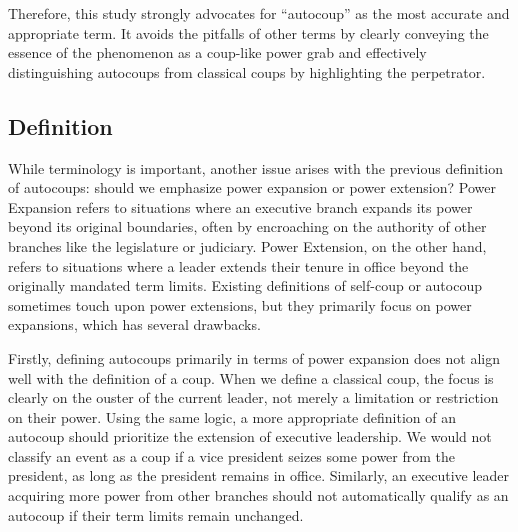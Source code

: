 \documentclass[
  12pt,
]{report}
\begin{document}
Therefore, this study strongly advocates for ``autocoup'' as the most
accurate and appropriate term. It avoids the pitfalls of other terms by
clearly conveying the essence of the phenomenon as a coup-like power
grab and effectively distinguishing autocoups from classical coups by
highlighting the perpetrator.

\subsection{Definition}\label{definition}

While terminology is important, another issue arises with the previous
definition of autocoups: should we emphasize power expansion or power
extension? Power Expansion refers to situations where an executive
branch expands its power beyond its original boundaries, often by
encroaching on the authority of other branches like the legislature or
judiciary. Power Extension, on the other hand, refers to situations
where a leader extends their tenure in office beyond the originally
mandated term limits. Existing definitions of self-coup or autocoup
sometimes touch upon power extensions, but they primarily focus on power
expansions, which has several drawbacks.

Firstly, defining autocoups primarily in terms of power expansion does
not align well with the definition of a coup. When we define a classical
coup, the focus is clearly on the ouster of the current leader, not
merely a limitation or restriction on their power. Using the same logic,
a more appropriate definition of an autocoup should prioritize the
extension of executive leadership. We would not classify an event as a
coup if a vice president seizes some power from the president, as long
as the president remains in office. Similarly, an executive leader
acquiring more power from other branches should not automatically
qualify as an autocoup if their term limits remain unchanged.
\end{document}
